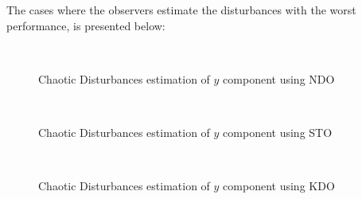 \documentclass[letterpaper%
, twoside%
, 12pt%
,memoire%
, english%
,creativecommons,hyperref%
]{thETS}
\theoremstyle{newThmStyle}
\begin{document}
The cases where the observers estimate the disturbances with the worst performance, is presented below:

\begin{figure}[H]
\centering
{}
\\ \parbox{0.75\textwidth}{\caption{Chaotic Disturbances estimation of $y$ component using NDO} \label{dis_m2_est_y_ndo}}
\end{figure}

\begin{figure}[H]
\centering
{}
\\ \parbox{0.75\textwidth}{\caption{Chaotic Disturbances estimation of $y$ component using STO} \label{dis_m2_est_y_sto}}
\end{figure}

\begin{figure}[H]
\centering
{}
\\ \parbox{0.75\textwidth}{\caption{Chaotic Disturbances estimation of $y$ component using KDO} \label{dis_m2_est_y_kdo}}
\end{figure}
\end{document}
